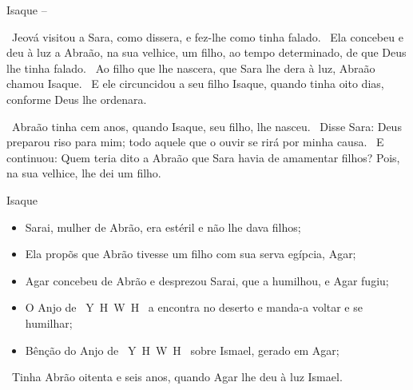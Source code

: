 \documentclass[12pt,aspectratio=169]{beamer}
\newcommand{\YA}{%
    \mbox{%
        Y\makebox[0pt][l]{\hspace{-0.178em}\raisebox{-0.00ex}{\scalebox{0.30}{E}}}%
        H\makebox[0pt][l]{\hspace{-0.010em}\raisebox{-0.00ex}{\scalebox{0.30}{O}}}%
        W\makebox[0pt][l]{\hspace{-0.245em}\raisebox{-0.00ex}{\scalebox{0.30}{A}}}%
        H%
    }%
}
\newcommand{\ver}[1]{%
    \raisebox{0.50ex}{%
        \scalebox{1.1}{%
            \pmb{\textbf{\textcolor{BSpbg}{#1}}}%
        }%
    }%
}
\newcommand{\QUOTE}[1]{%
    \par\noindent\hspace*{0.05\linewidth}%
    \begin{minipage}{0.9\linewidth}%
        \linespread{1.35}\large{#1}%
    \end{minipage}%
}
\newcommand{\YEL}[1]{{\textcolor{TXyel}{#1}}}
\newcommand{\GRE}[1]{{\textcolor{TXgre}{#1}}}
\newcommand{\BLU}[1]{{\textcolor{TXblu}{#1}}}
\newcommand{\MAG}[1]{{\textcolor{TXmag}{#1}}}
\newcommand{\BRI}[1]{{\textcolor{BSpbg}{#1}}}   %
\begin{document}
    \begin{frame}[allowframebreaks]{\YEL{Isaque} --}
        \QUOTE{%
            \ver{Gn 21.1}~Jeová \BRI{visitou} a Sara, \MAG{como dissera}, e \BRI{fez}-lhe
            \MAG{como tinha falado}.
            \ver{2}~Ela concebeu e deu à luz a Abraão, na sua velhice, um filho, \MAG{ao tempo
            determinado}, de que \BLU{Deus} lhe tinha \BLU{falado}.
            \ver{3}~Ao filho que lhe nascera, que Sara lhe dera à luz, Abraão chamou
            \YEL{Isaque}.
            \ver{4}~E ele \YEL{circuncidou} a seu filho Isaque, quando tinha \YEL{oito dias},
            \YEL{conforme Deus lhe ordenara}.
        }

        \pagebreak

        \QUOTE{%
            \ver{5}~Abraão tinha \GRE{cem anos}, quando Isaque, seu filho, lhe nasceu.
            \ver{6}~Disse Sara: Deus preparou \GRE{riso} para mim; todo aquele que o ouvir se
            rirá por minha causa.
            \ver{7}~E continuou: \BLU{Quem} teria dito a Abraão que Sara havia de amamentar
            filhos?  Pois, na sua velhice, lhe dei um filho.
        }
    \end{frame}

    \begin{frame}{\YEL{Isaque}}
        \begin{itemize}
            \item Sarai, mulher de Abrão, era estéril e não lhe dava filhos;
            \item Ela propõs que Abrão tivesse um filho com sua serva egípcia, Agar;
            \item Agar concebeu de Abrão e desprezou Sarai, que a humilhou, e Agar fugiu;
            \item O \BRI{Anjo de \YA} a encontra no deserto e manda-a voltar e se humilhar;
            \item Bênção do \BRI{Anjo de \YA} sobre Ismael, gerado em Agar;
        \end{itemize}

        \vspace{1.5\bigskipamount}

        \QUOTE{
            \ver{16}~Tinha Abrão \YEL{oitenta e seis anos}, quando Agar lhe deu à luz Ismael.
        }
    \end{frame}
\end{document}
